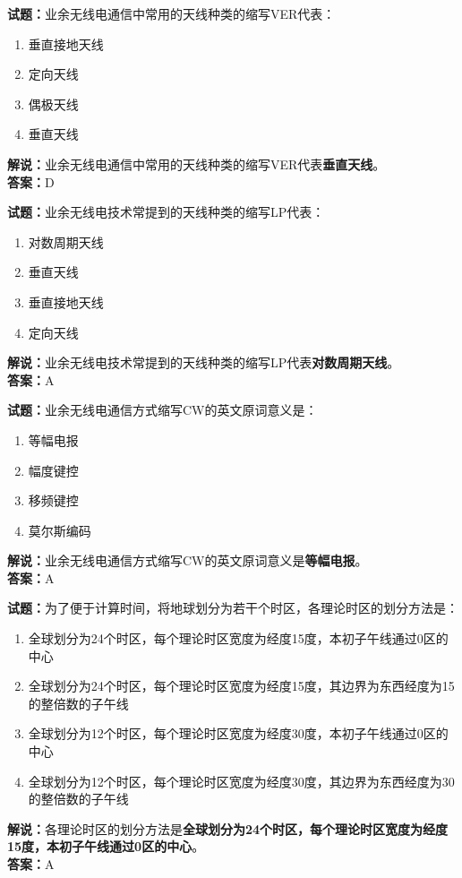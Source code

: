 \documentclass{ctexbook}
\begin{document}
\bigskip


\noindent\textbf{试题：}业余无线电通信中常用的天线种类的缩写VER代表：
\begin{enumerate}[leftmargin=3em]
\item 垂直接地天线
\item 定向天线
\item 偶极天线
\item 垂直天线
\end{enumerate}
\noindent\textbf{解说：}业余无线电通信中常用的天线种类的缩写VER代表\textbf{垂直天线}。\\\noindent\textbf{答案：}D



\bigskip


\noindent\textbf{试题：}业余无线电技术常提到的天线种类的缩写LP代表：
\begin{enumerate}[leftmargin=3em]
\item 对数周期天线
\item 垂直天线
\item 垂直接地天线
\item 定向天线
\end{enumerate}
\noindent\textbf{解说：}业余无线电技术常提到的天线种类的缩写LP代表\textbf{对数周期天线}。\\\noindent\textbf{答案：}A



\bigskip


\noindent\textbf{试题：}业余无线电通信方式缩写CW的英文原词意义是：
\begin{enumerate}[leftmargin=3em]
\item 等幅电报
\item 幅度键控
\item 移频键控
\item 莫尔斯编码
\end{enumerate}
\noindent\textbf{解说：}业余无线电通信方式缩写CW的英文原词意义是\textbf{等幅电报}。\\\noindent\textbf{答案：}A



\bigskip


\noindent\textbf{试题：}为了便于计算时间，将地球划分为若干个时区，各理论时区的划分方法是：
\begin{enumerate}[leftmargin=3em]
\item 全球划分为24个时区，每个理论时区宽度为经度15度，本初子午线通过0区的中心
\item 全球划分为24个时区，每个理论时区宽度为经度15度，其边界为东西经度为15的整倍数的子午线
\item 全球划分为12个时区，每个理论时区宽度为经度30度，本初子午线通过0区的中心
\item 全球划分为12个时区，每个理论时区宽度为经度30度，其边界为东西经度为30的整倍数的子午线
\end{enumerate}
\noindent\textbf{解说：}各理论时区的划分方法是\textbf{全球划分为24个时区，每个理论时区宽度为经度15度，本初子午线通过0区的中心}。\\\noindent\textbf{答案：}A
\end{document}
